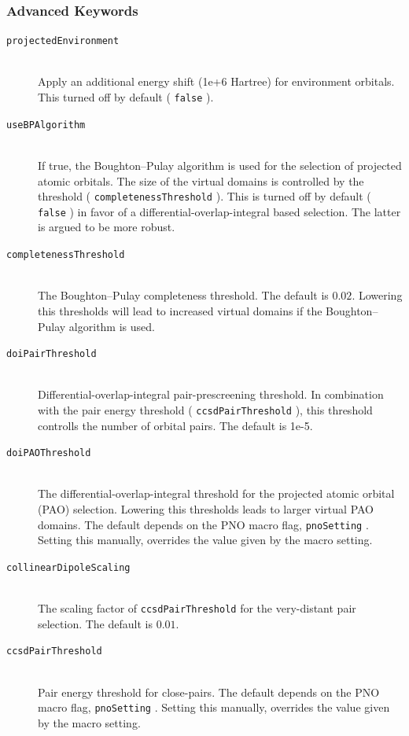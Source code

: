 \documentclass[bibliography=totocnumbered,a4paper,10pt,oneside]{scrbook}
\newcommand{\ttt}[1]{%
  \begingroup\setlength{\fboxsep}{1pt}%
  \colorbox{serenity-green!30}{\texttt{\hspace*{2pt}\vphantom{(g}#1\hspace*{2pt}}}%
  \endgroup
}
\begin{document}
\subsubsection{Advanced Keywords}
\begin{description}
    \item [\texttt{projectedEnvironment}]\hfill \\
    Apply an additional energy shift (1e+6 Hartree) for environment orbitals.
    This turned off by default (\ttt{false}).
    \item [\texttt{useBPAlgorithm}]\hfill \\
    If true, the Boughton--Pulay algorithm is used for the selection of projected atomic orbitals. The size of the
    virtual domains is controlled by the threshold (\ttt{completenessThreshold}). This is turned off by default
    (\ttt{false}) in favor of a differential-overlap-integral based selection. The latter is argued to be more robust.
    \item [\texttt{completenessThreshold}]\hfill \\
    The Boughton--Pulay completeness threshold. The default is $0.02$. Lowering this thresholds will lead to
    increased virtual domains if the Boughton--Pulay algorithm is used.
    \item [\texttt{doiPairThreshold}]\hfill \\
    Differential-overlap-integral pair-prescreening threshold. In combination with the pair energy threshold
    (\ttt{ccsdPairThreshold}), this threshold controlls the number of orbital pairs.
    The default is 1e-5.
    \item [\texttt{doiPAOThreshold}]\hfill \\
    The differential-overlap-integral threshold for the projected atomic orbital (PAO) selection. Lowering this
    thresholds leads to larger virtual PAO domains. The default depends on the PNO macro flag,
    \ttt{pnoSetting}. Setting this manually, overrides the value given by the macro setting.
    \item [\texttt{collinearDipoleScaling}]\hfill \\
    The scaling factor of \ttt{ccsdPairThreshold} for the very-distant pair selection.
    The default is $0.01$.
    \item [\texttt{ccsdPairThreshold}]\hfill \\
    Pair energy threshold for close-pairs. The default depends on the PNO macro flag, \ttt{pnoSetting}.
    Setting this manually, overrides the value given by the macro setting.

\end{description}
\end{document}
